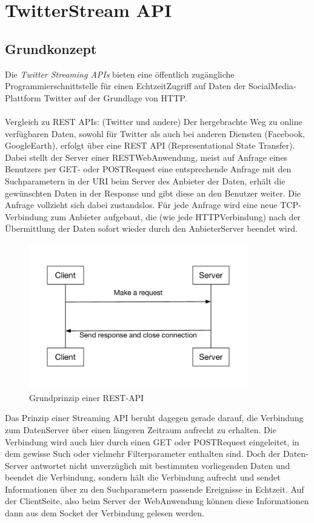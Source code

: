 \section{TwitterStream API}
\subsection{Grundkonzept}

Die \textit{Twitter Streaming APIs} bieten eine öffentlich zugängliche Programmierschnittstelle für einen Echtzeit­Zugriff auf Daten der Social­Media­Plattform Twitter auf der Grundlage von HTTP.
\\\\
Vergleich zu REST APIs: (Twitter und andere)
Der hergebrachte Weg zu online verfügbaren Daten, sowohl für Twitter als auch bei anderen
Diensten (Facebook, GoogleEarth), erfolgt über eine REST API (Representational State Transfer).
Dabei stellt der Server einer REST­Web­Anwendung, meist auf Anfrage eines Benutzers per GET-
oder POST­Request eine entsprechende Anfrage mit den Suchparametern in der URI beim Server
des Anbieter der Daten, erhält die gewünschten Daten in der Response und gibt diese an den
Benutzer weiter. Die Anfrage vollzieht sich dabei zustandslos. Für jede Anfrage wird eine neue
TCP­Verbindung zum Anbieter aufgebaut, die (wie jede HTTP­Verbindung) nach der
Übermittlung der Daten sofort wieder durch den Anbieter­Server beendet wird. \\

\begin{figure}[!h]
    \centering
    \includegraphics[width=0.85\textwidth]{Graphics/normal_rest_api}
    \caption{Grundprinzip einer REST-API}
   \label{fig:restapi}
\end{figure}
\newpage
Das Prinzip einer Streaming API beruht dagegen gerade darauf, die Verbindung zum Daten­Server
über einen längeren Zeitraum aufrecht zu erhalten. Die Verbindung wird auch hier durch einen
GET­ oder POST­Request eingeleitet, in dem gewisse Such­ oder vielmehr Filterparameter
enthalten sind. Doch der Daten­Server antwortet nicht unverzüglich mit bestimmten vorliegenden
Daten und beendet die Verbindung, sondern hält die Verbindung aufrecht und sendet
Informationen über zu den Suchparametern passende Ereignisse in Echtzeit. Auf der Client­Seite,
also beim Server der Web­Anwendung können diese Informationen dann aus dem Socket der
Verbindung gelesen werden. \\

